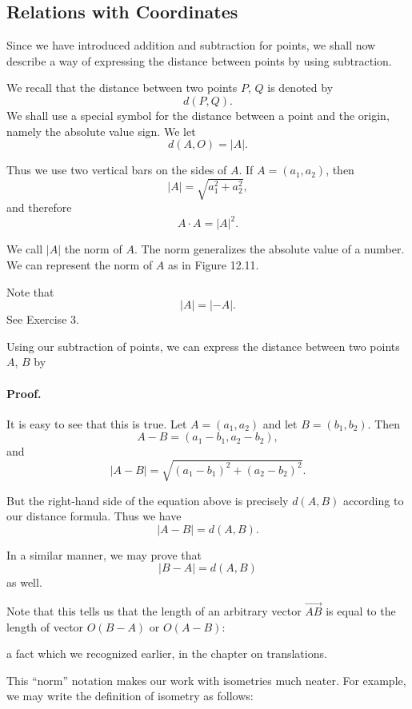 \documentclass[12pt]{book} %
\begin{document}
\begin{ExerciseList}
\section{Relations with Coordinates}

Since we have introduced addition and subtraction for points, we shall now describe a way of expressing the distance between points by using subtraction.

We recall that the distance between two points $P$, $Q$ is denoted by
\[
d(P,Q).
\]
We shall use a special symbol for the distance between a point and the origin, namely the absolute value sign. We let
\[
d(A,O)=|A|.
\]

Thus we use two vertical bars on the sides of $A$. If $A=(a_1,a_2)$, then
\[
|A|=\sqrt{a_1^2+a_2^2},
\]
and therefore
\[
A\cdot A=|A|^2.
\]

We call $|A|$ the norm of $A$. The norm generalizes the absolute value of a number. We can represent the norm of $A$ as in Figure 12.11.


Note that
\[
|A|=|-A|.
\]
See Exercise 3.

Using our subtraction of points, we can express the distance between two points $A$, $B$ by


\paragraph{Proof.}
It is easy to see that this is true. Let $A=(a_1,a_2)$ and let $B=(b_1,b_2)$. Then
\[
A-B=(a_1-b_1,a_2-b_2),
\]
and
\[
|A-B|=\sqrt{(a_1-b_1)^2+(a_2-b_2)^2}.
\]

But the right-hand side of the equation above is precisely $d(A,B)$ according to our distance formula. Thus we have
\[
|A-B|=d(A,B).
\]

In a similar manner, we may prove that
\[
|B-A|=d(A,B)
\]
as well.

Note that this tells us that the length of an arbitrary vector $\overrightarrow{AB}$ is equal to the length of vector $O(B-A)$ or $O(A-B)$:


a fact which we recognized earlier, in the chapter on translations.

This ``norm'' notation makes our work with isometries much neater. For example, we may write the definition of isometry as follows:


\end{ExerciseList}
\end{document}
